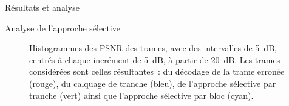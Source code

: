 \documentclass[letterpaper, twoside, 12pt,memoire]{thETS}
\begin{document}
\begin{chapter}{Résultats et analyse}
\begin{section}{Analyse de l'approche sélective}
\begin{figure}[htb]
\caption{Histogrammes des PSNR des trames, avec des intervalles de 5~dB, centrés
à chaque incrément de 5~dB, à partir de 20~dB. Les trames considérées sont
celles résultantes~: du décodage de la trame erronée (rouge), du calquage de
tranche (bleu), de l'approche sélective par tranche (vert) ainsi que
l'approche sélective par bloc (cyan).} 
\label{fig-FrameDistribution}
\end{figure}


\end{section}
\end{chapter}
\end{document}
